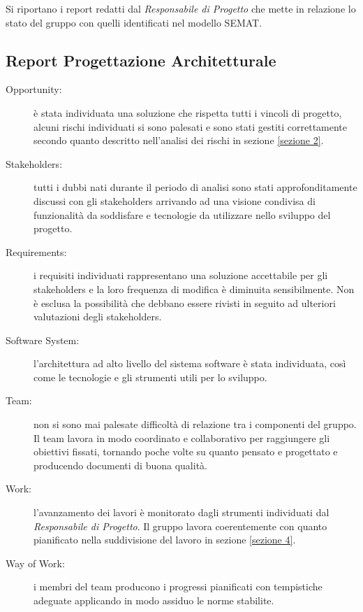 Si riportano i report redatti dal \textit{Responsabile di Progetto} che mette in relazione lo stato del gruppo con quelli identificati nel modello \gls{SEMAT}.

\subsection{Report Progettazione Architetturale}
\begin{description}
	\item[Opportunity:] è stata individuata una soluzione che rispetta tutti i vincoli di progetto, alcuni rischi individuati si sono palesati e sono stati gestiti correttamente secondo quanto descritto nell'analisi dei rischi in sezione \ref{sezione 2}.
	\item[Stakeholders:] tutti i dubbi nati durante il periodo di analisi sono stati approfonditamente discussi con gli \gls{stakeholders} arrivando ad una visione condivisa di funzionalità da soddisfare e tecnologie da utilizzare nello sviluppo del progetto.
	\item[Requirements:] i requisiti individuati rappresentano una soluzione accettabile per gli \gls{stakeholders} e la loro frequenza di modifica è diminuita sensibilmente. Non è esclusa la possibilità che debbano essere rivisti in seguito ad ulteriori valutazioni degli \gls{stakeholders}. 
	\item[Software System:] l'architettura ad alto livello del sistema software è stata individuata, così come le tecnologie e gli strumenti utili per lo sviluppo.
	\item[Team:] non si sono mai palesate difficoltà di relazione tra i componenti del gruppo. Il team lavora in modo coordinato e collaborativo per raggiungere gli obiettivi fissati, tornando poche volte su quanto pensato e progettato e producendo documenti di buona qualità.
	\item[Work:] l'avanzamento dei lavori è monitorato dagli strumenti individuati dal \textit{Responsabile di Progetto}. Il gruppo lavora coerentemente con quanto pianificato nella suddivisione del lavoro in sezione \ref{sezione 4}.
	\item[Way of Work:] i membri del team producono i progressi pianificati con tempistiche adeguate applicando in modo assiduo le norme stabilite. 
\end{description}

